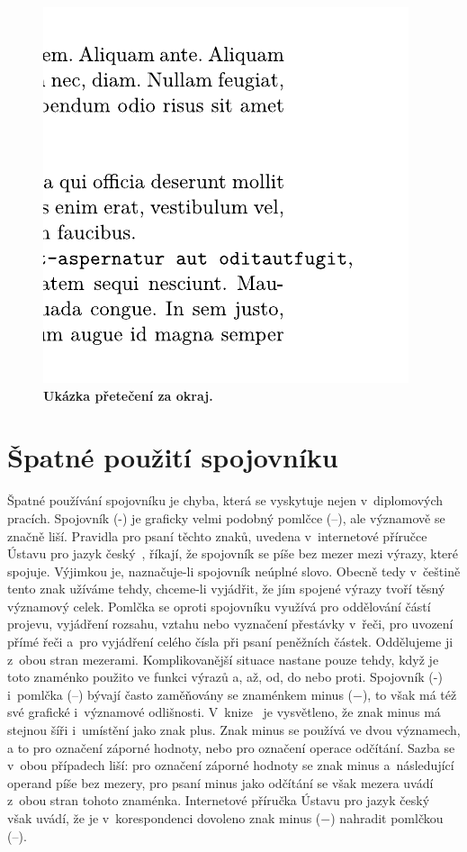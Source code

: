 \begin{figure}[H]
    \label{pic_overflow}
    \centering
    \includegraphics{obrazky-figures/overflow.pdf}
    \caption{\textbf{Ukázka přetečení za okraj.} }
\end{figure}


\section{Špatné použití spojovníku}
Špatné používání spojovníku je chyba, která se vyskytuje nejen v~diplomových
pracích. Spojovník (-) je graficky velmi podobný pomlčce (--), ale významově
se značně liší. Pravidla pro psaní těchto znaků, uvedena v~internetové příručce
Ústavu pro jazyk český~\cite{Ustav_pro_jazyk_cesky},
říkají, že spojovník se píše bez mezer mezi výrazy, které spojuje. Výjimkou
je, naznačuje-li spojovník neúplné slovo. Obecně tedy v~češtině tento znak
užíváme tehdy, chceme-li vyjádřit, že jím spojené výrazy tvoří těsný významový
celek. Pomlčka se oproti spojovníku využívá pro oddělování částí projevu,
vyjádření rozsahu, vztahu nebo vyznačení přestávky v~řeči, pro uvození
přímé řeči a~pro vyjádření celého čísla při psaní peněžních částek.
Oddělujeme ji z~obou stran mezerami. Komplikovanější situace nastane pouze
tehdy, když je toto znaménko použito ve funkci výrazů a, až, od, do nebo proti.
Spojovník (-) i~pomlčka (--) bývají často zaměňovány se znaménkem minus ($-$),
to však má též své grafické i~významové odlišnosti.
V~knize~\cite{Pruvodce_tvorbou_dokumentu} je vysvětleno, že znak minus má stejnou
šíři i~umístění jako znak plus. Znak minus se používá ve dvou významech, a to
pro označení záporné hodnoty, nebo pro označení operace odčítání. Sazba se v~obou
případech liší: pro označení záporné hodnoty se znak minus a~následující
operand píše bez mezery, pro psaní minus jako odčítání se však mezera uvádí
z~obou stran tohoto znaménka. Internetové příručka Ústavu pro jazyk
český~\cite{Ustav_pro_jazyk_cesky} však uvádí, že je v~korespondenci dovoleno
znak minus ($-$) nahradit pomlčkou (--).

